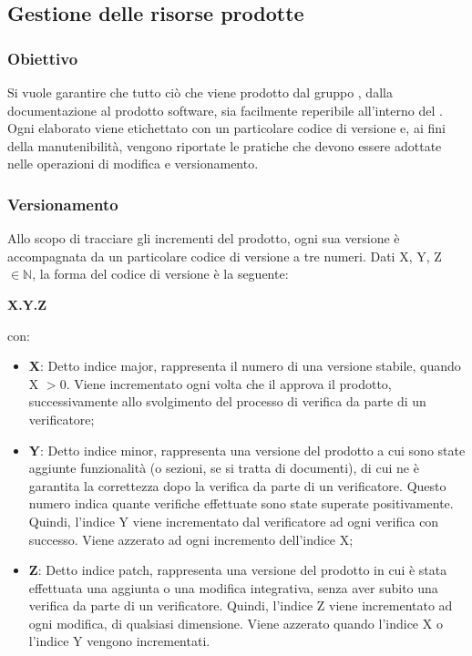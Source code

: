 \subsection{Gestione delle risorse prodotte}
\subsubsection{Obiettivo}
Si vuole garantire che tutto ciò che viene prodotto dal gruppo \Gruppo{}, dalla documentazione al prodotto software, sia facilmente reperibile all’interno del .
Ogni elaborato viene etichettato con un particolare codice di versione e, ai fini della manutenibilità, vengono riportate le pratiche che devono essere adottate nelle operazioni di modifica e versionamento.

\subsubsection{Versionamento}
Allo scopo di tracciare gli incrementi del prodotto, ogni sua versione è accompagnata da un particolare codice di versione a tre numeri. Dati X, Y, Z $\in \mathbb{N}$, la forma del codice di versione è la seguente:
\begin{center}
	\textbf{X.Y.Z}
\end{center}
con:
\begin{itemize}
	\item \textbf{X}: Detto indice major, rappresenta il numero di una versione stabile, quando X $> 0$.
	Viene incrementato ogni volta che il \Responsabile{} approva il prodotto, successivamente allo svolgimento del processo di verifica da parte di un verificatore;
	\item \textbf{Y}: Detto indice minor, rappresenta una versione del prodotto a cui sono state aggiunte funzionalità (o sezioni, se si tratta di documenti), di cui ne è garantita la correttezza dopo la verifica da parte di un verificatore.
	Questo numero indica quante verifiche effettuate sono state superate positivamente.
	Quindi, l'indice Y viene incrementato dal verificatore ad ogni verifica con successo.
	Viene azzerato ad ogni incremento dell'indice X;
	\item \textbf{Z}: Detto indice patch, rappresenta una versione del prodotto in cui è stata effettuata una aggiunta o una modifica integrativa, senza aver subito una verifica da parte di un verificatore.
	Quindi, l'indice Z viene incrementato ad ogni modifica, di qualsiasi dimensione.
	Viene azzerato quando l'indice X o l'indice Y vengono incrementati.
\end{itemize}

